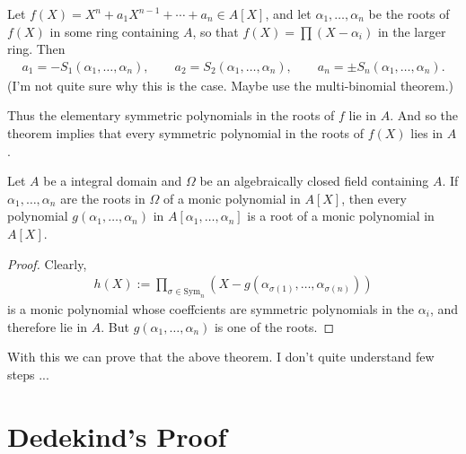 Let \(f(X) = X^n + a_1 X^{n-1} + \cdots + a_n \in A[X]\), and let \(\alpha_1, \ldots, \alpha_n\) be the roots of \(f(X)\) in some ring containing \(A\), so that \(f(X) = \prod (X - \alpha_i)\) in the larger ring. Then
\begin{align*}
    a_1 = -S_1(\alpha_1, \ldots, \alpha_n), \qquad a_2 = S_2(\alpha_1, \ldots, \alpha_n), \qquad a_n = \pm S_n(\alpha_1, \ldots, \alpha_n) \text{.}
\end{align*}
(I'm not quite sure why this is the case. Maybe use the multi-binomial theorem.)

Thus the elementary symmetric polynomials in the roots of \(f\) lie in \(A\). And so the theorem implies that every symmetric polynomial in the roots of \(f(X)\) lies in \(A\).
\begin{thmbox}
    \begin{proposition}
        Let \(A\) be a integral domain and \(\Omega\) be an algebraically closed field containing \(A\). If \(\alpha_1, \ldots, \alpha_n\) are the roots in \(\Omega\) of a monic polynomial in \(A[X]\), then every polynomial \(g(\alpha_1, \ldots, \alpha_n)\) in \(A[\alpha_1, \ldots, \alpha_n]\) is a root of a monic polynomial in \(A[X]\).
    \end{proposition}
\end{thmbox}
\begin{proof}
    Clearly,
    \begin{align*}
        h(X) := \prod_{\sigma \in \mathrm{Sym}_n} (X -  g(\alpha_{\sigma(1)}, \ldots, \alpha_{\sigma(n  )}))
    \end{align*}
    is a monic polynomial whose coeffcients are symmetric polynomials in the \(\alpha_i\), and therefore lie in \(A\). But \(g(\alpha_1, \ldots, \alpha_n)\) is one of the roots.
\end{proof}
With this we can prove that the above theorem. I don't quite understand few steps ...

\section*{Dedekind's Proof}

